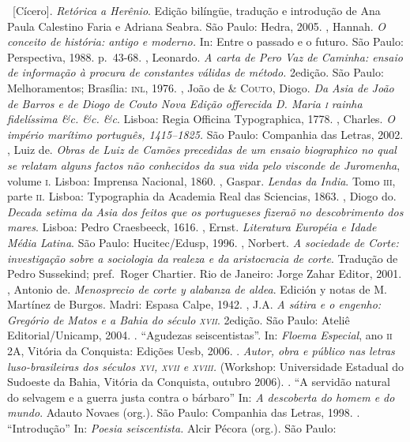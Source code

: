 \begin{bibliohedra}
\ [Cícero]. \textit{Retórica a Herênio}. Edição bilíngüe, tradução
e introdução de Ana Paula Calestino Faria e Adriana Seabra. São Paulo:
Hedra, 2005.
, Hannah. \textit{O conceito de história: antigo e
moderno.} In: Entre o passado e o futuro. São Paulo: Perspectiva,
1988. p.~43-68. 
, Leonardo. \textit{A carta de Pero Vaz de Caminha: ensaio de
informação à procura de constantes válidas de método.} 2\ai edição. São
Paulo: Melhoramentos;  Brasília: \textsc{inl}, 1976.
, João de \& \textsc{Couto}, Diogo. \textit{Da Asia de João de Barros e de
Diogo de Couto Nova Edição offerecida D. Maria \textsc{i} rainha fidelíssima
\&c. \&c. \&c}. Lisboa: Regia Officina Typographica, 1778.
, Charles. \textit{O império marítimo português, 1415--1825. } São
Paulo: Companhia das Letras, 2002.
, Luiz de. \textit{Obras de Luiz de Camões precedidas de um ensaio
biographico no qual se relatam alguns factos não conhecidos da sua vida
pelo visconde de Juromenha}, volume \textsc{i}. Lisboa: Imprensa Nacional, 1860.
, Gaspar. \textit{Lendas da India}.
Tomo \textsc{iii}, parte \textsc{ii}. Lisboa: Typographia da Academia Real
das Sciencias, 1863.
, Diogo do. \textit{Decada setima da Asia dos feitos que os
portugueses fizeraõ no descobrimento dos mares}. Lisboa: Pedro Craesbeeck, 1616. 
, Ernst. \textit{Literatura Européia e Idade Média Latina}. São
Paulo: Hucitec/Edusp, 1996.
, Norbert. \textit{A sociedade de Corte: investigação sobre a
sociologia da realeza e da aristocracia de corte}. Tradução de Pedro
Sussekind; pref.~Roger Chartier. Rio de Janeiro: Jorge Zahar
Editor, 2001.
, Antonio de. \textit{Menosprecio de corte y alabanza de aldea}.
Edición y notas de M. Martínez de Burgos. Madri: Espasa Calpe, 1942.
, J.A. \textit{A sátira e o engenho: Gregório de Matos e a Bahia
do século \textsc{xvii}}. 2\ai edição. São Paulo: Ateliê Editorial/Unicamp,
2004.
\titidem. ``Agudezas seiscentistas''. In: \textit{Floema
Especial}, ano \textsc{ii} 2A, Vitória da Conquista: Edições Uesb, 2006. 
\titidem. \textit{Autor, obra e público nas letras luso-brasileiras 
dos séculos \textsc{xvi, xvii} e \textsc{xviii}.} (Workshop: Universidade
Estadual do Sudoeste da Bahia, Vitória da Conquista, outubro 2006).
\titidem. ``A servidão natural do selvagem e a
guerra justa contra o bárbaro'' In:  \textit{A descoberta do homem e do mundo}. 
Adauto Novaes (org.). São Paulo: Companhia das Letras, 1998.
\titidem. ``Introdução'' In: \textit{Poesia seiscentista.} Alcir Pécora (org.). São Paulo:

\end{bibliohedra}
